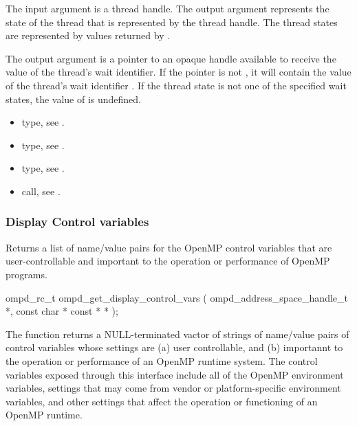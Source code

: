 \argdesc

The input argument  is a thread handle. The output argument
 represents the state of the thread that is represented by the thread handle.
The thread states are represented by values returned by .

The output argument  is a pointer to an opaque handle available to receive the value
of the thread's wait identifier. If the  pointer is not , it will contain
the value of the thread's wait identifier . If the thread state is not one of the
specified wait states, the value of  is undefined.

\crossreferences
\begin{itemize}
  \item {} type, see .
	\item {} type, see .
	\item {} type, see .
	\item {} call, see .
\end{itemize}


\subsubsection{Display Control variables}

\label{subsubsubsec:ompd_get_display_control_vars}
\summary
Returns a list of name/value pairs for the OpenMP control variables
that are user-controllable and important to the operation or
performance of OpenMP programs.
\format
\begin{cspecific}
\begin{ompSyntax}
ompd_rc_t ompd_get_display_control_vars (
  ompd_address_space_handle_t *,
  const char * const * *
);
\end{ompSyntax}
\end{cspecific}

\descr
The function  returns a
NULL-terminated vactor of strings of name/value pairs of control
variables whose settings are (a) user controllable,
and (b) importannt to the operation or performance of an OpenMP
runtime system.
The control variables exposed through this interface include all
of the OpenMP environment variables, settings that may come from
vendor or platform-specific environment variables, and other
settings that affect the operation or functioning of an OpenMP
runtime.

